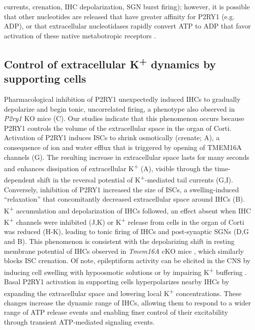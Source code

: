 \documentclass[9pt,lineno]{elife}
\begin{document}
currents, crenation, IHC depolarization, SGN burst firing); however, it is possible that other nucleotides are released that have greater affinity for P2RY1 (e.g. ADP), or that extracellular nucleotidases rapidly convert ATP to ADP that favor activation of these native metabotropic receptors \citep{VonKugelgen2006a,Vlajkovic1998,Vlajkovic2002}. 

\subsection{Control of extracellular K\textsuperscript{+} dynamics by supporting cells}
Pharmacological inhibition of P2RY1 unexpectedly induced IHCs to gradually depolarize and begin tonic, uncorrelated firing, a phenotype also observed in \textit{P2ry1} KO mice (C). Our studies indicate that this phenomenon occurs because P2RY1 controls the volume of the extracellular space in the organ of Corti. Activation of P2RY1 induces ISCs to shrink osmotically (crenate; A), a consequence of ion and water efflux that is triggered by opening of TMEM16A channels (G). The resulting increase in extracellular space lasts for many seconds and enhances dissipation of extracellular K\textsuperscript{+} (A), visible through the time-dependent shift in the reversal potential of K\textsuperscript{+}-mediated tail currents (G,I). Conversely, inhibition of P2RY1 increased the size of ISCs, a swelling-induced ``relaxation'' that concomitantly decreased extracellular space around IHCs (B). K\textsuperscript{+} accumulation and depolarization of IHCs followed, an effect absent when IHC K\textsuperscript{+} channels were inhibited (J,K) or K\textsuperscript{+} release from cells in the organ of Corti was reduced (H-K), leading to tonic firing of IHCs and post-synaptic SGNs (D,G and B). This phenomenon is consistent with the depolarizing shift in resting membrane potential of IHCs observed in \textit{Tmem16A} cKO mice \citep{Wang2015}, which similarly blocks ISC crenation. Of note, epileptiform activity can be elicited in the CNS by inducing cell swelling with hypoosmotic solutions or by impairing K\textsuperscript{+} buffering \citep{Larson2018,Murphy2017,Thrane2013}. Basal P2RY1 activation in supporting cells hyperpolarizes nearby IHCs by expanding the extracellular space and lowering local K\textsuperscript{+} concentrations. These changes increase the dynamic range of IHCs, allowing them to respond to a wider range of ATP release events and enabling finer control of their excitability through transient ATP-mediated signaling events. 
\end{document}
